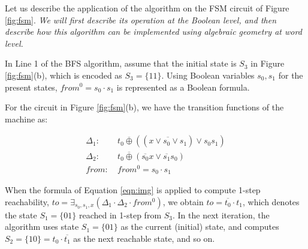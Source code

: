 Let us describe the application of the algorithm on the  FSM circuit
of Figure \ref{fig:fsm}. {\it We will first describe its operation at the
Boolean level, and then describe how this algorithm can be implemented
using algebraic geometry at word level.} 

\begin{figure}[H]
\end{figure}

In Line 1 of the BFS algorithm, assume that the initial state
is $S_3$ in Figure \ref{fig:fsm}(b), which is encoded as 
$S_3 = \{11\}$. Using Boolean variables $s_0, s_1$ for the present
states, $from^0 = s_0\cdot s_1$ is represented as a Boolean formula. 



\begin{Example}
For the circuit in Figure \ref{fig:fsm}(b), we have the transition
functions of the machine as:

\begin{align*}
\Delta_1: & ~t_0 \overline{\oplus} ((\overline{x \vee s_0 \vee s_1}) \vee s_0 s_1)\\
\Delta_2: & ~t_0 \overline{\oplus} (\overline{s_0}x \vee \overline{s_1}s_0)\\
from:     & ~from^0 = s_0\cdot s_1
\end{align*}

When the formula of Equation \ref{eqn:img} is applied to compute 1-step
reachability, $to = \exists _{s_0, s_1, x} (\Delta_1 \cdot \Delta_2
\cdot from^0)$, we obtain $to = \overline{t_0}\cdot t_1$, which denotes
the state $S_1 = \{01\}$ reached in 1-step from $S_3$.
In the next iteration, the algorithm uses state $S_1 = \{01\}$ as the
current (initial) state, and computes $S_2 = \{10\} = t_0\cdot
\overline{t_1}$ as the next reachable state, and so on. 
\end{Example}

